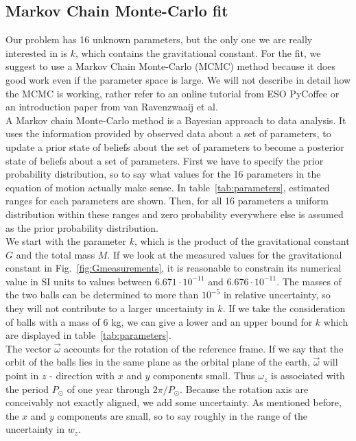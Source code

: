 \documentclass[prb,preprint]{revtex4-1}
\begin{document}
\subsection{Markov Chain Monte-Carlo fit}

Our problem has 16 unknown parameters, but the only one we are really interested in is $k$, which contains the gravitational constant. For the fit, we suggest to use a Markov Chain Monte-Carlo (MCMC) method because it does good work even if the parameter space is large. We will not describe in detail how the MCMC is working, rather refer to an online tutorial from ESO PyCoffee\cite{esopycoffee} or an introduction paper from van Ravenzwaaij et al.\cite{vanRavenzwaaij16} \\

A Markov chain Monte-Carlo method is a Bayesian approach to data analysis. It uses the information provided by observed data about a set of parameters, to update a prior state of beliefs about the set of parameters to become a posterior state of beliefs about a set of parameters. First we have to specify the prior probability distribution, so to say what values for the 16 parameters in the equation of motion actually make sense. In table~\ref{tab:parameters}, estimated ranges for each parameters are shown. Then, for all 16 parameters a uniform distribution within these ranges and zero probability everywhere else is assumed as the prior probability distribution. \\

We start with the parameter $k$, which is the product of the gravitational constant $G$ and the total mass $M$. If we look at the measured values for the gravitational constant in Fig.~\ref{fig:Gmeasurements}, it is reasonable to constrain its numerical value in SI units to values between $6.671 \cdot 10^{-11}$ and $6.676 \cdot 10^{-11}$. The masses of the two balls can be determined to more than $10^{-5}$ in relative uncertainty, so they will not contribute to a larger uncertainty in $k$. If we take the consideration of balls with a mass of 6 kg, we can give a lower and an upper bound for $k$ which are displayed in table~\ref{tab:parameters}.\\

The vector $\vec{\omega}$ accounts for the rotation of the reference frame. If we say that the orbit of the balls lies in the same plane as the orbital plane of the earth, $\vec{\omega}$ will point in $z$ - direction with $x$ and $y$ components small. Thus $\omega_z$ is associated with the period $P_\odot$ of one year through $2\pi/P_\odot$. Because the rotation axis are conceivably not exactly aligned, we add some uncertainty. As mentioned before, the $x$ and $y$ components are small, so to say roughly in the range of the uncertainty in $w_z$.\\
\end{document}
